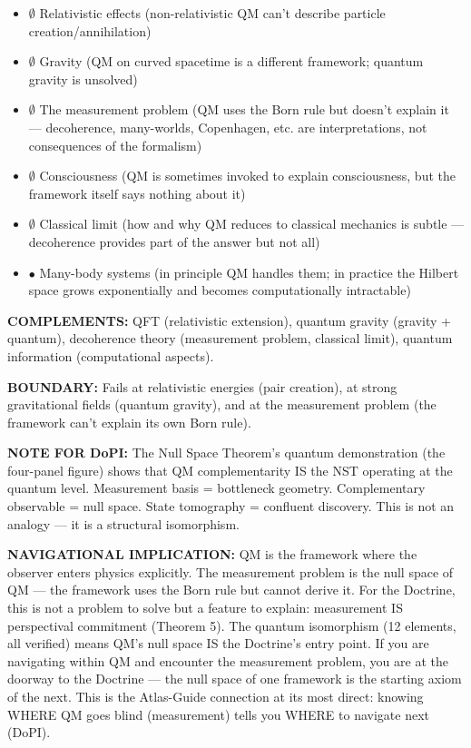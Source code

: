 \begin{itemize}[nosep,leftmargin=*]
  \item $\emptyset$ Relativistic effects (non-relativistic QM can't describe particle creation/\allowbreak annihilation)
  \item $\emptyset$ Gravity (QM on curved spacetime is a different framework; quantum gravity is unsolved)
  \item $\emptyset$ The measurement problem (QM uses the Born rule but doesn't explain it — decoherence, many-worlds, Copenhagen, etc. are interpretations, not consequences of the formalism)
  \item $\emptyset$ Consciousness (QM is sometimes invoked to explain consciousness, but the framework itself says nothing about it)
  \item $\emptyset$ Classical limit (how and why QM reduces to classical mechanics is subtle — decoherence provides part of the answer but not all)
  \item $\bullet$ Many-body systems (in principle QM handles them; in practice the Hilbert space grows exponentially and becomes computationally intractable)
\end{itemize}


\textbf{COMPLEMENTS:} QFT (relativistic extension), quantum gravity (gravity + quantum), decoherence theory (measurement problem, classical limit), quantum information (computational aspects).


\textbf{BOUNDARY:} Fails at relativistic energies (pair creation), at strong gravitational fields (quantum gravity), and at the measurement problem (the framework can't explain its own Born rule).


\textbf{NOTE FOR DoPI:} The Null Space Theorem's quantum demonstration (the four-panel figure) shows that QM complementarity IS the NST operating at the quantum level. Measurement basis = bottleneck geometry. Complementary observable = null space. State tomography = confluent discovery. This is not an analogy — it is a structural isomorphism.


\textbf{NAVIGATIONAL IMPLICATION:} QM is the framework where the observer enters physics explicitly. The measurement problem is the null space of QM — the framework uses the Born rule but cannot derive it. For the Doctrine, this is not a problem to solve but a feature to explain: measurement IS perspectival commitment (Theorem 5). The quantum isomorphism (12 elements, all verified) means QM's null space IS the Doctrine's entry point. If you are navigating within QM and encounter the measurement problem, you are at the doorway to the Doctrine — the null space of one framework is the starting axiom of the next. This is the Atlas-Guide connection at its most direct: knowing WHERE QM goes blind (measurement) tells you WHERE to navigate next (DoPI).


